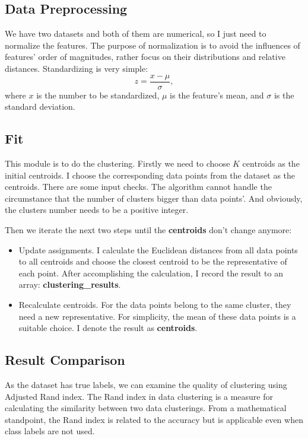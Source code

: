 \documentclass[12pt,a4paper]{article}
\begin{document}
\subsection{Data Preprocessing}
We have two datasets and both of them are numerical, so I just need to normalize the features. The purpose of normalization is to avoid the influences of features' order of magnitudes, rather focus on their distributions and relative distances. Standardizing is very simple:
\begin{equation}
z=\frac{x-\mu}{\sigma},
\end{equation}
where $x$ is the number to be standardized, $\mu$ is the feature's mean, and $\sigma$ is the standard deviation. 

\subsection{Fit}
This module is to do the clustering. Firstly we need to choose $K$ centroids as the initial centroids. I choose the corresponding data points from the dataset as the centroids. There are some input checks. The algorithm cannot handle the circumstance that the number of clusters bigger than data points'. And obviously, the clusters number needs to be a positive integer.

Then we iterate the next two steps until the \textbf{centroids} don't change anymore:
\begin{itemize}
	\item Update assignments. I calculate the Euclidean distances from all data points to all centroids and choose the closest centroid to be the representative of each point. After accomplishing the calculation, I record the result to an array: \textbf{clustering\_results}.

	\item Recalculate centroids. For the data points belong to the same cluster, they need a new representative. For simplicity, the mean of these data points is a suitable choice. I denote the result as \textbf{centroids}.
\end{itemize}

\subsection{Result Comparison}
As the dataset has true labels, we can examine the quality of clustering using Adjusted Rand index. The Rand index in data clustering is a measure for calculating the similarity between two data clusterings. From a mathematical standpoint, the Rand index is related to the accuracy but is applicable even when class labels are not used.
\end{document}
